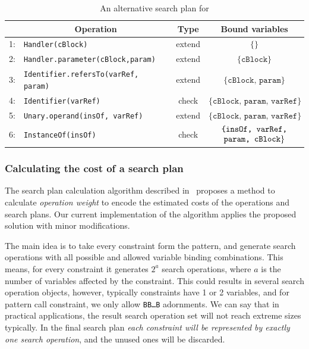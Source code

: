 \begin{table}[h]
	\centering
	\begin{tabular}{c|l|c|c}
		\hline
		& \multicolumn{1}{|c|}{Operation} & Type & Bound variables \\ \hline
		1: & \texttt{Handler(cBlock)} & extend & $\{ \}$\\
		2: & \texttt{Handler.parameter(cBlock,param)} & extend & $\{ \texttt{cBlock} \}$\\
		3: & \texttt{Identifier.refersTo(varRef, param)} & extend & $\{ \texttt{cBlock, param} \}$\\
		4: & \texttt{Identifier(varRef)} & check & $\{ \texttt{cBlock, param, varRef} \}$\\
		5: & \texttt{Unary.operand(insOf, varRef)}  & extend & $\{ \texttt{cBlock, param, varRef} \}$\\
		6: & \texttt{InstanceOf(insOf)}  & check & $ \stackedlines{ \texttt{\{insOf, varRef,}}{\texttt{param, cBlock}\}} $ \\
		
	\end{tabular}
	\caption{An alternative search plan for \catchproblem}
	\label{tab:catch_flat_normalized_from_debugger}
\end{table}

\subsubsection{Calculating the cost of a search plan}

The search plan calculation algorithm described in~\cite{DBLP:journals/sosym/VarroDWS15} proposes a method to calculate \emph{operation weight} to encode the estimated costs of the operations and search plans. Our current implementation of the algorithm applies the proposed solution with minor modifications.

The main idea is to take every constraint form the pattern, and generate search operations with all possible and allowed variable binding combinations. This means, for every constraint it generates $2^a$ search operations, where $a$ is the number of variables affected by the constraint. This could results in several search operation objects, however, typically constraints have 1 or 2 variables, and for pattern call constraint, we only allow \texttt{BB\ldots B} adornments. We can say that in practical applications, the result search operation set will not reach extreme sizes typically. In the final search plan \emph{each constraint will be represented by exactly one search operation}, and the unused ones will be discarded.
 
